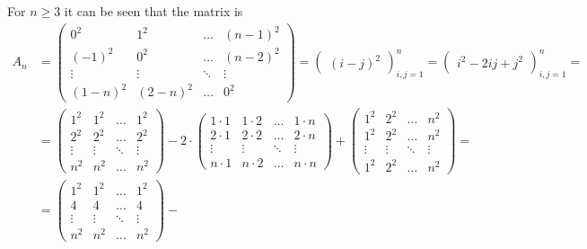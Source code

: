 \documentclass[../../main.tex]{subfiles}
\begin{document}
  For $n \geq 3$ it can be seen that the matrix is
  \begin{equation*}
    \begin{split}
      A_n & = \begin{pmatrix}
        0^2 & 1^2 & \dots & (n - 1)^2 \\
        (-1)^2 & 0^2 & \dots & (n - 2)^2 \\
        \vdots & \vdots & \ddots & \vdots \\
        (1 - n)^2 & (2 - n)^2 & \dots & 0^2
      \end{pmatrix} =
      \begin{pmatrix} (i - j)^2 \end{pmatrix}_{i, j = 1}^n =
      \begin{pmatrix} i^2 - 2ij + j^2 \end{pmatrix}_{i, j = 1}^n
      = \\ & =
      \begin{pmatrix}
        1^2 & 1^2 & \dots & 1^2 \\
        2^2 & 2^2 & \dots & 2^2 \\
        \vdots & \vdots & \ddots & \vdots \\
        n^2 & n^2 & \dots & n^2
      \end{pmatrix} -
      2 \cdot \begin{pmatrix}
        1 \cdot 1 & 1 \cdot 2 & \dots & 1 \cdot n \\
        2 \cdot 1 & 2 \cdot 2 & \dots & 2 \cdot n \\
        \vdots & \vdots & \ddots & \vdots \\
        n \cdot 1 & n \cdot 2 & \dots & n \cdot n
      \end{pmatrix} +
      \begin{pmatrix}
        1^2 & 2^2 & \dots & n^2 \\
        1^2 & 2^2 & \dots & n^2 \\
        \vdots & \vdots & \ddots & \vdots \\
        1^2 & 2^2 & \dots & n^2
      \end{pmatrix}
      = \\ & =
      \begin{pmatrix}
        1^2 & 1^2 & \dots & 1^2 \\
        4 & 4 & \dots & 4 \\
        \vdots & \vdots & \ddots & \vdots \\
        n^2 & n^2 & \dots & n^2
      \end{pmatrix} -

\end{split}
\end{equation*}
\end{document}
